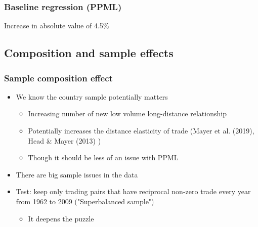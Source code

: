 \documentclass{beamer}
\begin{document}
\begin{frame}[plain]\frametitle{Baseline regression (PPML)}
\begin{figure}[h!]
\begin{center}
\setlength{\fboxrule}{1pt} %
\setlength{\fboxsep}{.1in} %
\end{center}
\end{figure}
Increase in absolute value of 4.5\%
\end{frame}

\subsection{Composition and sample effects}
\begin{frame}\frametitle{Sample composition effect}
\begin{itemize}
\item We know the country sample potentially matters
	\begin{itemize}
	\item Increasing number of new low volume long-distance relationship
	\item Potentially increases the distance elasticity of trade (Mayer et al. (2019), Head \& Mayer (2013) ) 
	\item Though it should be less of an issue with PPML
	\end{itemize}
\item There are big sample issues in the data	
\item Test: keep only trading pairs that have reciprocal non-zero trade every year from 1962 to 2009 ("Superbalanced sample")
	\begin{itemize}
	\item It deepens the puzzle 
	\end{itemize}
\end{itemize}
\end{frame}
\end{document}
